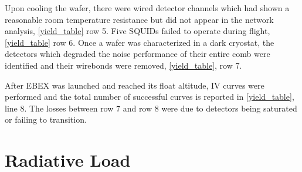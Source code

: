 Upon cooling the wafer, there were wired detector channels which had shown a reasonable room temperature resistance but did not appear in the network analysis, \TAB\ref{yield_table} row 5. 
Five \ac{SQUID}s failed to operate during flight, \TAB\ref{yield_table} row 6. 
Once a wafer was characterized in a dark cryostat, the detectors which degraded the noise performance of their entire comb were identified and their wirebonds were removed, \TAB\ref{yield_table}, row 7. 

After \ac{EBEX} was launched and reached its float altitude, IV curves were performed and the total number of successful curves is reported in \TAB\ref{yield_table}, line 8. 
The losses between row 7 and row 8 were due to detectors being saturated or failing to transition. 

%
%



\section{Radiative Load}
\label{sec:radiative_load}



